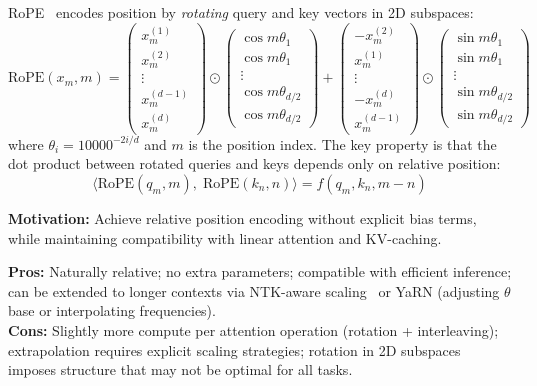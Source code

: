 RoPE~\cite{su2024roformer} encodes position by \emph{rotating} query and key vectors in 2D subspaces: 
\[
\text{RoPE}(x_m, m) = \begin{pmatrix} x_m^{(1)} \\ x_m^{(2)} \\ \vdots \\ x_m^{(d-1)} \\ x_m^{(d)} \end{pmatrix}
  \odot
  \begin{pmatrix} \cos m\theta_1 \\ \cos m\theta_1 \\ \vdots \\ \cos m\theta_{d/2} \\ \cos m\theta_{d/2} \end{pmatrix}
  +
  \begin{pmatrix} -x_m^{(2)} \\ x_m^{(1)} \\ \vdots \\ -x_m^{(d)} \\ x_m^{(d-1)} \end{pmatrix}
  \odot
  \begin{pmatrix} \sin m\theta_1 \\ \sin m\theta_1 \\ \vdots \\ \sin m\theta_{d/2} \\ \sin m\theta_{d/2} \end{pmatrix}
\]
 where $\theta_i = 10000^{-2i/d}$ and $m$ is the position index. The key property is that the dot product between rotated queries and keys depends only on relative position: 
\[
\langle \text{RoPE}(q_m, m),\; \text{RoPE}(k_n, n) \rangle = f(q_m, k_n, m-n)
\]

\textbf{Motivation:} Achieve relative position encoding without explicit bias terms, while maintaining compatibility with linear attention and KV-caching.

\textbf{Pros:} Naturally relative; no extra parameters; compatible with efficient inference; can be extended to longer contexts via NTK-aware scaling~\cite{peng2023yarn} or YaRN (adjusting $\theta$ base or interpolating frequencies).\\

\textbf{Cons:} Slightly more compute per attention operation (rotation + interleaving); extrapolation requires explicit scaling strategies; rotation in 2D subspaces imposes structure that may not be optimal for all tasks.

